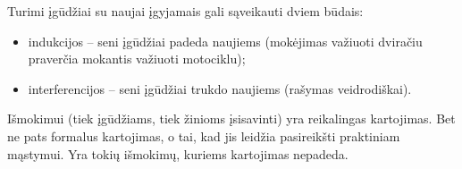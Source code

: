 Turimi įgūdžiai su naujai įgyjamais gali sąveikauti dviem būdais:

\begin{itemize}
  \item indukcijos – seni įgūdžiai padeda naujiems (mokėjimas važiuoti
    dviračiu praverčia mokantis važiuoti motociklu);
  \item interferencijos – seni įgūdžiai trukdo naujiems (rašymas 
    veidrodiškai).
\end{itemize}


Išmokimui (tiek įgūdžiams, tiek žinioms įsisavinti) yra reikalingas 
kartojimas. Bet ne pats formalus kartojimas, o tai, kad jis leidžia
pasireikšti praktiniam mąstymui. Yra tokių išmokimų, kuriems kartojimas
nepadeda.
